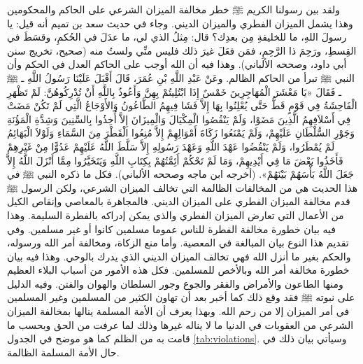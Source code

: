 ولقد بين رسولنا الكريم ﷺ خطر مخالفة الميزان الشرعي على الحاكم والمحكومين وهذا يشمل الميزان الفطري والميزان الديني. وجاء في حديث سعد بن تميم أنه قيل: يا رسولَ اللهِ، ما للخليفةِ مِن بعدِك؟ قال: مِثلُ الذي لي، ما عدَلَ في الحُكمِ، وقسَطَ في القِسطِ، ورَحِمَ ذا الرَّحِمِ، فمَن فعَلَ غيرَ ذلك فليس منِّي ولستُ منه {\footnotesize (صحيح، تخريج سنن أبي داود، وصححه الألباني)}. وهذا فيه أن الله أوجب على الحاكم العدل في الحكم وأن النبي ﷺ تبرأ من الحاكم الظالم. وعَنْ عَبْدِ اللَّهِ بْنِ عُمَرَ، قَالَ أَقْبَلَ عَلَيْنَا رَسُولُ اللَّهِ ـ ﷺ ـ فَقَالَ «يَا مَعْشَرَ الْمُهَاجِرِينَ خَمْسٌ إِذَا ابْتُلِيتُمْ بِهِنَّ وَأَعُوذُ بِاللَّهِ أَنْ تُدْرِكُوهُنَّ: لَمْ تَظْهَرِ الْفَاحِشَةُ فِي قَوْمٍ قَطُّ حَتَّى يُعْلِنُوا بِهَا إِلاَّ فَشَا فِيهِمُ الطَّاعُونُ وَالأَوْجَاعُ الَّتِي لَمْ تَكُنْ مَضَتْ فِي أَسْلاَفِهِمُ الَّذِينَ مَضَوْا، وَلَمْ يَنْقُصُوا الْمِكْيَالَ وَالْمِيزَانَ إِلاَّ أُخِذُوا بِالسِّنِينَ وَشِدَّةِ الْمَؤُنَةِ وَجَوْرِ السُّلْطَانِ عَلَيْهِمْ، وَلَمْ يَمْنَعُوا زَكَاةَ أَمْوَالِهِمْ إِلاَّ مُنِعُوا الْقَطْرَ مِنَ السَّمَاءِ وَلَوْلاَ الْبَهَائِمُ لَمْ يُمْطَرُوا، وَلَمْ يَنْقُضُوا عَهْدَ اللَّهِ وَعَهْدَ رَسُولِهِ إِلاَّ سَلَّطَ اللَّهُ عَلَيْهِمْ عَدُوًّا مِنْ غَيْرِهِمْ فَأَخَذُوا بَعْضَ مَا فِي أَيْدِيهِمْ، وَمَا لَمْ تَحْكُمْ أَئِمَّتُهُمْ بِكِتَابِ اللَّهِ وَيَتَخَيَّرُوا مِمَّا أَنْزَلَ اللَّهُ إِلاَّ جَعَلَ اللَّهُ بَأْسَهُمْ بَيْنَهُمْ».
{\footnotesize (أخرجه ابن ماجه وصححه الألباني)}.
فكل ما ذكره النبي ﷺ في هذا الحديث هي من المخالفات الظالمة التي تخالف الميزان الشرعي، ولكن الرسول ﷺ قدم مخالفة الميزان الفطري على الميزان الديني. فالمجاهرة بالمعاصي وإنقاص الكيل من الأعمال التي تعارض الميزان الفطري والذي يمكن إدراكه بالفطرة السليمة. وهذا فيه بيان خطورة مخالفة الفطرة للناس عموما مسلمين كانوا أو غير مسلمين. وفي تقديم هذا النوع بيان المبالغة في المعصية. وأما منع الزكاة، ومخالفة أمر الله ورسوله، والحكم بغير ما أنزل الله فهي تخالف الميزان الديني الذي يدرك بالوحي. وهذا فيه بيان خطورة مخالفة أمر الله وبالأخص للمسلمين. فكل هذه الأمور من أسباب البلاء العظيم ومنها الطاعون والأمراض والفقر والجوع وجور السلطان والهوان والفتن. وفيه الدليل على نبوته ﷺ فقد وقع ذلك كما أخبر بعد أن تهاون الكثير من المسلمين وغير المسلمين في أمر الميزان إلا من رحم الله. وبهذا يعرف أن الأمة المسلمة ينالها بمخالفة الميزان الشرعي من العقوبات في الدنيا ما لا يناله غيرها وذلك لما عرفت من الحق وبحسب ما قامت به من الظلم كما هو موضح في الجدول \ref{tab:violations}. وسيأتي بيان ذلك في حال الأمة المسلمة الظالمة.

